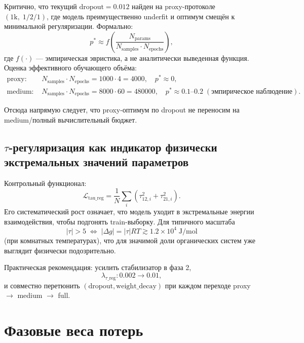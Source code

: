 \documentclass[11pt]{article}
\begin{document}
Критично, что текущий $\mathrm{dropout}=0.012$ найден на proxy-протоколе
$(1\text{k},\;1/2/1)$, где модель преимущественно underfit и оптимум смещён к минимальной регуляризации. Формально:
\begin{equation*}
p^* \approx f\!\left(\frac{N_{\mathrm{params}}}{N_{\mathrm{samples}}\cdot N_{\mathrm{epochs}}}\right),
\end{equation*}
где $f(\cdot)$ --- эмпирическая эвристика, а не аналитически выведенная функция.
Оценка эффективного обучающего объёма:
\begin{align*}
\text{proxy: } &N_{\mathrm{samples}}\cdot N_{\mathrm{epochs}}=1000\cdot4=4000,\quad p^*\approx0,\\
\text{medium: } &N_{\mathrm{samples}}\cdot N_{\mathrm{epochs}}=8000\cdot60=480000,\quad p^*\approx0.1\text{--}0.2 \; (\text{эмпирическое наблюдение}).
\end{align*}

Отсюда напрямую следует, что proxy-оптимум по dropout не переносим на medium/полный вычислительный бюджет.

\subsection{$\tau$-регуляризация как индикатор физически экстремальных значений параметров}

Контрольный функционал:
\begin{equation*}
\mathcal{L}_{\mathrm{tau\_reg}}=\frac{1}{N}\sum_i\left(\tau_{12,i}^2+\tau_{21,i}^2\right).
\end{equation*}
Его систематический рост означает, что модель уходит в экстремальные энергии взаимодействия, чтобы подгонять train-выборку. Для типичного масштаба
\begin{equation*}
|\tau|>5 \;\Longleftrightarrow\; |\Delta g|=|\tau|RT \gtrsim 1.2\times10^4\;\mathrm{J/mol}
\end{equation*}
(при комнатных температурах), что для значимой доли органических систем уже выглядит физически подозрительно.

Практическая рекомендация: усилить стабилизатор в фаза 2,
\begin{equation*}
\lambda_{\tau\_\mathrm{reg}}: 0.002 \rightarrow 0.01,
\end{equation*}
и совместно перетюнить $(\mathrm{dropout},\mathrm{weight\_decay})$ при каждом переходе proxy $\rightarrow$ medium $\rightarrow$ full.

\section{Фазовые веса потерь}
\end{document}
